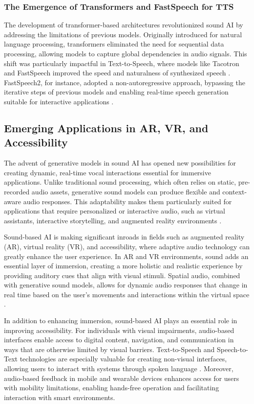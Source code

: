 \subsubsection{The Emergence of Transformers and FastSpeech for TTS}
The development of transformer-based architectures revolutionized sound AI by addressing the limitations of previous models. Originally introduced for natural language processing, transformers eliminated the need for sequential data processing, allowing models to capture global dependencies in audio signals. This shift was particularly impactful in Text-to-Speech, where models like Tacotron and FastSpeech improved the speed and naturalness of synthesized speech \cite{ren2019fastspeech, wang2017tacotron}. FastSpeech2, for instance, adopted a non-autoregressive approach, bypassing the iterative steps of previous models and enabling real-time speech generation suitable for interactive applications \cite{ren2020fastspeech}. 

\subsection{Emerging Applications in AR, VR, and Accessibility}
The advent of generative models in sound AI has opened new possibilities for creating dynamic, real-time vocal interactions essential for immersive applications. Unlike traditional sound processing, which often relies on static, pre-recorded audio assets, generative sound models can produce flexible and context-aware audio responses. This adaptability makes them particularly suited for applications that require personalized or interactive audio, such as virtual assistants, interactive storytelling, and augmented reality environments \cite{1386017}\cite{van2016wavenet}.

Sound-based AI is making significant inroads in fields such as augmented reality (AR), virtual reality (VR), and accessibility, where adaptive audio technology can greatly enhance the user experience. In AR and VR environments, sound adds an essential layer of immersion, creating a more holistic and realistic experience by providing auditory cues that align with visual stimuli. Spatial audio, combined with generative sound models, allows for dynamic audio responses that change in real time based on the user’s movements and interactions within the virtual space \cite{su2024sonifyar}.

In addition to enhancing immersion, sound-based AI plays an essential role in improving accessibility. For individuals with visual impairments, audio-based interfaces enable access to digital content, navigation, and communication in ways that are otherwise limited by visual barriers. Text-to-Speech and Speech-to-Text technologies are especially valuable for creating non-visual interfaces, allowing users to interact with systems through spoken language \cite{wald2005enhancing}. Moreover, audio-based feedback in mobile and wearable devices enhances access for users with mobility limitations, enabling hands-free operation and facilitating interaction with smart environments.

